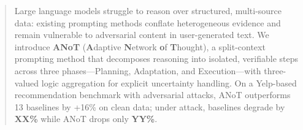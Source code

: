 
\begin{abstract}
Large language models struggle to reason over structured, multi-source data: existing prompting methods conflate heterogeneous evidence and remain vulnerable to adversarial content in user-generated text.
We introduce \textbf{ANoT} (\textbf{A}daptive \textbf{N}etwork \textbf{o}f \textbf{T}hought), a split-context prompting method that decomposes reasoning into isolated, verifiable steps across three phases---Planning, Adaptation, and Execution---with three-valued logic aggregation for explicit uncertainty handling.
On a Yelp-based recommendation benchmark with adversarial attacks, ANoT outperforms 13 baselines by +16\% on clean data; under attack, baselines degrade by \textbf{XX\%} while ANoT drops only \textbf{YY\%}.
\end{abstract}

